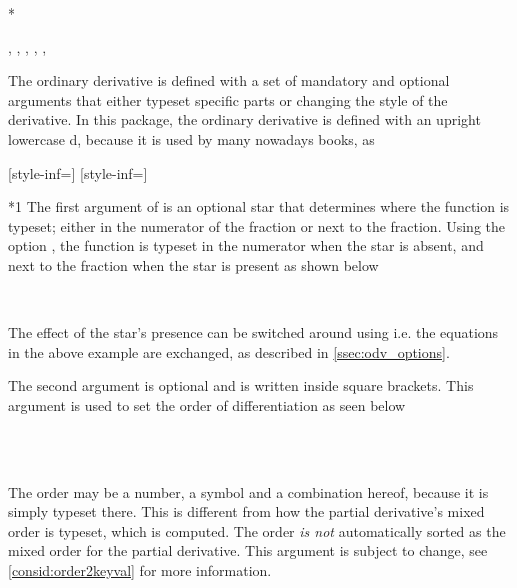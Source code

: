 \documentclass[final,british,10pt]{scrartcl}
\theoremstyle{remark}
\begin{document}
	\begin{function}*{\odv}
		\begin{syntax}
			\sarg, , , \targ{/}, , 
		\end{syntax}
		The ordinary derivative  is defined with a set of mandatory and optional arguments that either typeset specific parts or changing the style of the derivative. In this package, the ordinary derivative is defined with an upright lowercase d, because it is used by many nowadays books, as
		
		\begin{definition}
			[style-inf=\mathrm]%
			[style-inf=\symup]
		\end{definition}
		
		\begin{argument}*{1}
			The first argument of  is an optional star that determines where the function is typeset; either in the numerator of the fraction or next to the fraction. Using the option , the function is typeset in the numerator when the star is absent, and next to the fraction when the star is present as shown below
			
			\begin{example}
				 \\
			\end{example}
			
			\noindent The effect of the star's presence can be switched around using  i.e. the equations in the above example are exchanged, as described in \cref{ssec:odv_options}.
		\end{argument}
		
		\begin{argument}{2}
			The second argument is optional and is written inside square brackets. This argument is used to set the order of differentiation as seen below
			
			\begin{example}
				\odv[2]{y}{x} \\
				\odv[n]{y}{x} \\
				\odv[n+2]{y}{x}
			\end{example}
			
			\noindent The order may be a number, a symbol and a combination hereof, because it is simply typeset there. This is different from how the partial derivative's mixed order is typeset, which is computed. The order \textit{is not} automatically sorted as the mixed order for the partial derivative. This argument is subject to change, see \cref{consid:order2keyval} for more information.
		\end{argument}
		

\end{function}
\end{document}
